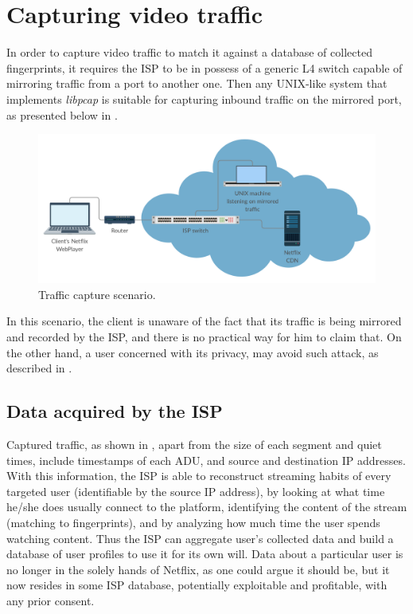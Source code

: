 \section{Capturing video traffic}

In order to capture video traffic to match it against a database of collected
fingerprints, it requires the ISP to be in possess of a generic L4 switch
capable of mirroring traffic from a port to another one. Then any UNIX-like
system that implements \emph{libpcap} is suitable for capturing inbound traffic
on the mirrored port, as presented below in .


\begin{figure}[!htb]
  \centering
  \includegraphics[width=\columnwidth]{img/schema.png}
  \caption{Traffic capture scenario.}
  \label{fig:schema}
\end{figure}

In this scenario, the client is unaware of the fact that its traffic is being
mirrored and recorded by the ISP, and there is no practical way for him to
claim that. On the other hand, a user concerned with its privacy, may avoid
such attack, as described in .

\subsection{Data acquired by the ISP}

Captured traffic, as shown in , apart from the size of each
segment and quiet times, include timestamps of each ADU, and source and
destination IP addresses. With this information, the ISP is able to reconstruct
streaming habits of every targeted user (identifiable by the source IP
address),  by looking at what time he/she does usually connect to the platform,
identifying the content of the stream (matching to fingerprints), and by
analyzing how much time the user spends watching content. Thus the ISP can
aggregate user's collected data and build a database of user profiles to use it
for its own will. Data about a particular user is no longer in the solely hands
of Netflix, as one could argue it should be, but it now resides in some ISP
database, potentially exploitable and profitable, with any prior consent.

